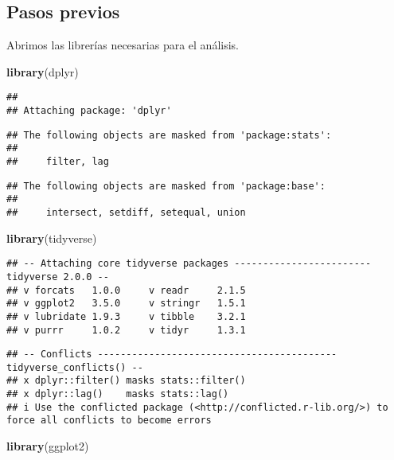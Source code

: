 \documentclass[
]{article}
\newenvironment{Shaded}{\begin{snugshade}}{\end{snugshade}}
\newcommand{\FunctionTok}[1]{\textcolor[rgb]{0.13,0.29,0.53}{\textbf{#1}}}
\newcommand{\NormalTok}[1]{#1}
\begin{document}
\hypertarget{pasos-previos}{%
\subsection{Pasos previos}\label{pasos-previos}}

Abrimos las librerías necesarias para el análisis.

\begin{Shaded}
\begin{Highlighting}[]
\FunctionTok{library}\NormalTok{(dplyr)}
\end{Highlighting}
\end{Shaded}

\begin{verbatim}
## 
## Attaching package: 'dplyr'
\end{verbatim}

\begin{verbatim}
## The following objects are masked from 'package:stats':
## 
##     filter, lag
\end{verbatim}

\begin{verbatim}
## The following objects are masked from 'package:base':
## 
##     intersect, setdiff, setequal, union
\end{verbatim}

\begin{Shaded}
\begin{Highlighting}[]
\FunctionTok{library}\NormalTok{(tidyverse)}
\end{Highlighting}
\end{Shaded}

\begin{verbatim}
## -- Attaching core tidyverse packages ------------------------ tidyverse 2.0.0 --
## v forcats   1.0.0     v readr     2.1.5
## v ggplot2   3.5.0     v stringr   1.5.1
## v lubridate 1.9.3     v tibble    3.2.1
## v purrr     1.0.2     v tidyr     1.3.1
\end{verbatim}

\begin{verbatim}
## -- Conflicts ------------------------------------------ tidyverse_conflicts() --
## x dplyr::filter() masks stats::filter()
## x dplyr::lag()    masks stats::lag()
## i Use the conflicted package (<http://conflicted.r-lib.org/>) to force all conflicts to become errors
\end{verbatim}

\begin{Shaded}
\begin{Highlighting}[]
\FunctionTok{library}\NormalTok{(ggplot2)}
\end{Highlighting}
\end{Shaded}
\end{document}
